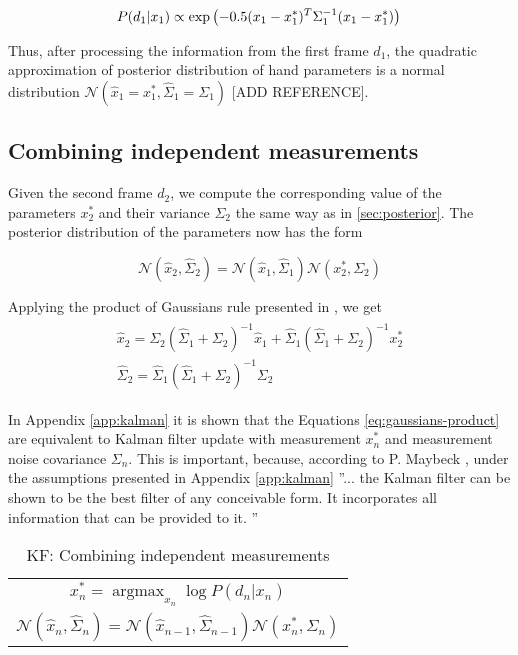 \documentclass[10pt,twocolumn,letterpaper]{article}
\begin{document}
\begin{equation}
P(d_1|x_1) \propto \exp\left(- 0.5(x_1 - x_1^*)^T \Sigma_1^{-1}  (x_1 - x_1^*) \right)\\
\end{equation}

Thus, after processing the information from the first frame $d_1$, the quadratic approximation of posterior distribution of hand parameters is a normal distribution $\mathcal{N}\left(\hat{x}_1 = x_1^*,  \hat{\Sigma}_1 = \Sigma_1 \right)$ [ADD REFERENCE].

\subsection {Combining independent measurements} \label{sec:combining}

Given the second frame $d_2$, we compute the corresponding value of the parameters $x_2^*$ and their variance $\Sigma_2$ the same way as in \ref{sec:posterior}. The posterior distribution of the parameters now has the form 

\begin{equation}
\mathcal{N}(\hat{x}_2, \hat{\Sigma}_2) = \mathcal{N}(\hat{x}_1, \hat{\Sigma}_1) \mathcal{N}(x_2^*, \Sigma_2)
\end{equation}

Applying the product of Gaussians rule presented in \cite{petersen2008matrix}, we get 
\begin{align}
\begin{split}
\hat{x}_2 = \Sigma_2 (\hat{\Sigma}_1 + \Sigma_2)^{-1} \hat{x}_1 + 
\hat{\Sigma}_1 (\hat{\Sigma}_1 + \Sigma_2)^{-1} x_2^*\\
\hat{\Sigma}_2 = \hat{\Sigma}_1 (\hat{\Sigma}_1 + \Sigma_2)^{-1} \Sigma_2
\end{split} \label{eq:gaussians-product}
\end{align}

In Appendix \ref{app:kalman} it is shown that the Equations \ref{eq:gaussians-product} are equivalent to Kalman filter update with measurement $x_n^*$ and measurement noise covariance $\Sigma_n$. This is important, because, according to P. Maybeck \cite{maybeck1979stochastic}, under the assumptions presented in Appendix \ref{app:kalman} ''... the Kalman filter can be shown to be the best filter of any conceivable form. It incorporates all information that can be provided to it. ''

\begin{table}[!h] 
\centering
\caption{KF: Combining independent measurements\label{tab:combining}} 
\begin{tabular}{|c|}
\hline
$x_n^* = \operatorname{argmax}_{x_n} \log P(d_n|x_n)$ \\
$\mathcal{N}(\hat{x}_n, \hat{\Sigma}_n) = \mathcal{N}(\hat{x}_{n - 1}, \hat{\Sigma}_{n - 1}) \mathcal{N}(x_n^*, \Sigma_n)$ \\
	
\hline
\end{tabular}
\end{table}
\end{document}
